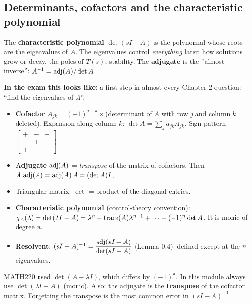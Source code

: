 \subsection{Determinants, cofactors and the characteristic polynomial \texorpdfstring{}{}}\label{ss:2-1}
\begin{plainbox}
The \textbf{characteristic polynomial} $\det(sI-A)$ is the polynomial whose roots are the eigenvalues of $A$.
The eigenvalues control \emph{everything} later: how solutions grow or decay, the poles of $T(s)$, stability.
The \textbf{adjugate} is the ``almost-inverse'': $A^{-1}=\operatorname{adj}(A)/\det A$.
\par\smallskip\textbf{In the exam this looks like:} a first step in almost every Chapter 2 question: ``find the eigenvalues of $A$''.
\end{plainbox}
\begin{defbox}
\begin{itemize}
\item \textbf{Cofactor} $A_{jk}=(-1)^{j+k}\times$(determinant of $A$ with row $j$ and column $k$ deleted). Expansion along column $k$: $\det A=\sum_j a_{jk}A_{jk}$. Sign pattern $\begin{bmatrix}+&-&+\\-&+&-\\+&-&+\end{bmatrix}$.
\item \textbf{Adjugate} $\operatorname{adj}(A)$ = \emph{transpose} of the matrix of cofactors. Then $A\,\operatorname{adj}(A)=\operatorname{adj}(A)\,A=(\det A)I$.
\item Triangular matrix: $\det$ = product of the diagonal entries.
\item \textbf{Characteristic polynomial} (control-theory convention): $\chi_A(\lambda)=\det(\lambda I-A)=\lambda^n-\operatorname{trace}(A)\lambda^{n-1}+\dots+(-1)^n\det A$. It is monic of degree $n$.
\item \textbf{Resolvent}: $(sI-A)^{-1}=\dfrac{\operatorname{adj}(sI-A)}{\det(sI-A)}$ (Lemma 0.4), defined except at the $n$ eigenvalues.
\end{itemize}
\end{defbox}
\begin{warnbox}
MATH220 used $\det(A-\lambda I)$, which differs by $(-1)^n$. In this module always use $\det(\lambda I-A)$ (monic).
Also: the adjugate is the \textbf{transpose} of the cofactor matrix. Forgetting the transpose is the most common error in $(sI-A)^{-1}$.
\end{warnbox}

